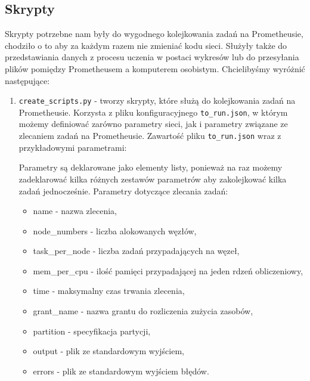 \subsection{Skrypty}
Skrypty potrzebne nam były do wygodnego kolejkowania zadań na Prometheusie, chodziło o to aby za 
każdym razem nie zmieniać kodu sieci. Służyły także do przedstawiania danych z procesu uczenia w postaci wykresów
lub do przesyłania plików pomiędzy Prometheusem a komputerem osobistym. Chcielibyśmy wyróżnić następujące:
\begin{enumerate}
	\item {\texttt{create\_scripts.py} } - 
	tworzy skrypty, które służą do kolejkowania zadań na Prometheusie. Korzysta z pliku konfiguracyjnego \texttt{to\_run.json},
	w którym możemy definiować zarówno parametry sieci, jak i parametry związane ze zlecaniem zadań na Prometheusie.
	Zawartość pliku \texttt{to\_run.json} wraz z przykładowymi parametrami:
	
	\begin{import}
		[
		  {
		    "beginning": "#!/bin/sh",
		    "name": "#SBATCH -J test",
		    "node_numbers": "#SBATCH -N 1",
		    "tasks_per_node": "#SBATCH --ntasks-per-node=1",
		    "mem_per_cpu": "#SBATCH --mem-per-cpu=5GB",
		    "time": "#SBATCH --time=00:20:00",
		    "grant_name": "#SBATCH -A ap2018",
		    "partition": "#SBATCH -p plgrid",
		    "output": "#SBATCH --output=",
		    "errors": "#SBATCH --error=",
		    "hidden_size": "100",
		    "num_layers": "2",
		    "num_epochs": "5",
		    "batch_size": "40",
		    "timesteps": "50",
		    "learning_rate": "0.004",
		    "authors_size": "100",
		    "vocab_size": "48",
		    "save_path": "../results/",
		    "learning_tensors_path": "../data/dutch/tensors/known/",
		    "testing_tensors_path": "../data/dutch/tensors/known/",
		    "language": "DU"
		  }
		]
	\end{import}
	Parametry są deklarowane jako elementy listy, ponieważ na raz możemy zadeklarować kilka różnych zestawów
	parametrów aby zakolejkować kilka zadań jednocześnie.
	Parametry dotyczące zlecania zadań:
	\begin{itemize}
	  \item name - nazwa zlecenia,
	  \item node\_numbers - liczba alokowanych węzłów,
	  \item task\_per\_node - liczba zadań przypadających na węzeł,
	  \item mem\_per\_cpu - ilość pamięci przypadającej na jeden rdzeń obliczeniowy,
	  \item time - maksymalny czas trwania zlecenia,
	  \item grant\_name - nazwa grantu do rozliczenia zużycia zasobów,
	  \item partition - specyfikacja partycji,
	  \item output - plik ze standardowym wyjściem,
	  \item errors - plik ze standardowym wyjściem błędów.
	\end{itemize}
	

\end{enumerate}
